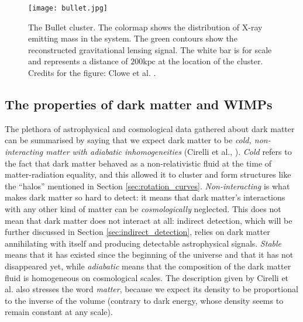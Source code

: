 \begin{figure}[!ht]
	\centering
	\texttt{[image: bullet.jpg]}
	\caption{The Bullet cluster. The colormap shows the distribution of X-ray emitting mass in the system. The green contours show the reconstructed gravitational lensing signal. The white bar is for scale and represents a distance of \(200 \mathrm{kpc} \) at the location of the cluster. Credits for the figure: Clowe et al. \cite{Clowe_2006}.}
	\label{fig:bullet}
\end{figure}

\subsection{The properties of dark matter and WIMPs}

The plethora of astrophysical and cosmological data gathered about dark matter can be summarised by saying that we expect dark matter to be \emph{cold, non-interacting matter with adiabatic inhomogeneities} (Cirelli et al., \cite[Chapter 1]{Cirelli_2024}). \emph{Cold} refers to the fact that dark matter behaved as a non-relativistic fluid at the time of matter-radiation equality, and this allowed it to cluster and form structures like the ``halos'' mentioned in Section \ref{sec:rotation_curves}. \emph{Non-interacting} is what makes dark matter so hard to detect: it means that dark matter's interactions with any other kind of matter can be \emph{cosmologically} neglected. This does not mean that dark matter does not interact at all: indirect detection, which will be further discussed in Section \ref{sec:indirect_detection}, relies on dark matter annihilating with itself and producing detectable astrophysical signals. \emph{Stable} means that it has existed since the beginning of the universe and that it has not disappeared yet, while \emph{adiabatic} means that the composition of the dark matter fluid is homogeneous on cosmological scales. The description given by Cirelli et al. also stresses the word \emph{matter}, because we expect its density to be proportional to the inverse of the volume (contrary to dark energy, whose density seems to remain constant at any scale).

